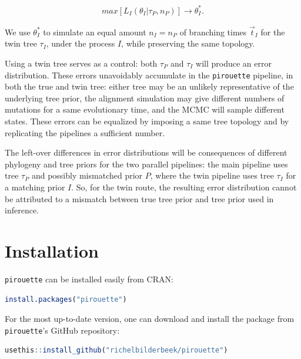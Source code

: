 \documentclass{article}
\begin{document}
\begin{align}
    max[L_{\mathit{I}}(\theta_{\mathit{I}}|\tau_{\mathit{P}}, n_{\mathit{P}})] 
\rightarrow \theta^{*}_{\mathit{I}}.
\end{align}

We use $\theta^{*}_{\mathit{I}}$ to simulate an equal amount 
$n_{\mathit{I}} = n_{\mathit{P}}$ 
of branching times $\Vec{t}_{\mathit{I}}$ for the twin tree 
$\tau_{\mathit{I}}$, under the process $\mathit{I}$, 
while preserving the same topology.

Using a twin tree serves as a control: both $\tau_{\mathit{P}}$ and 
$\tau_{\mathit{I}}$ will produce an error distribution. 
These errors unavoidably accumulate in the \verb;pirouette; pipeline,
in both the true and twin tree: either tree may be an unlikely representative
of the underlying tree prior, the alignment simulation may give different
numbers of mutations for a same evolutionary time, 
and the MCMC will sample different states.
These errors can be equalized by imposing a same tree topology and by
replicating the pipelines a sufficient number.

The left-over differences in error distributions will be 
consequences of different phylogeny and tree priors for the two parallel 
pipelines: the main pipeline uses tree $\tau_{\mathit{P}}$ and
possibly mismatched prior $\mathit{P}$, where the twin pipeline
uses tree $\tau_{\mathit{I}}$ for a matching prior $\mathit{I}$.
So, for the twin route, the resulting error distribution cannot be 
attributed to a mismatch between true tree prior and tree prior used in
inference.

\section{Installation}

\verb;pirouette; can be installed easily from CRAN:
\begin{lstlisting}[language=R, floatplacement=ht, frame=single]
install.packages("pirouette")
\end{lstlisting}

For the most up-to-date version, 
one can download and install the package from \verb;pirouette;'s GitHub 
repository:

\begin{lstlisting}[language=R, floatplacement=ht, frame=single]
usethis::install_github("richelbilderbeek/pirouette")
\end{lstlisting}
\end{document}
